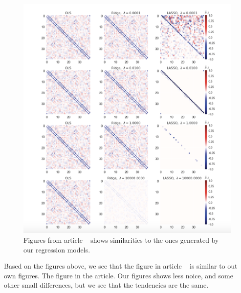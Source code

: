 \begin{figure}[H]
\includegraphics[width = 0.7\paperwidth]{figures/Regression_metha_article.png} 
\caption{Figures from article ~\cite{HighBias} shows similarities to the ones generated by our regression models.} 
\label{fig:regression-mehta}
\end{figure}

Based on the figures above, we see that the figure in article ~\cite{HighBias} 
is similar to out own figures. The figure in the article. Our figures
shows less noice, and some other small differences,  but we see that the tendencies are the same. 

